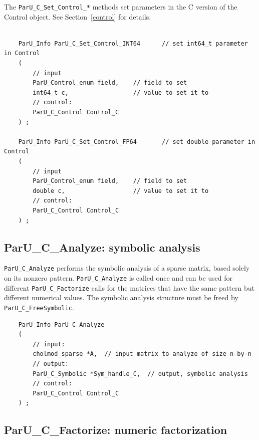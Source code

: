 \documentclass[12pt]{article}
\begin{document}
The \verb'ParU_C_Set_Control_*' methods set parameters in the C version of the
Control object.  See Section~\ref{control} for details.

    {\footnotesize
    \begin{verbatim}

    ParU_Info ParU_C_Set_Control_INT64      // set int64_t parameter in Control
    (
        // input
        ParU_Control_enum field,    // field to set
        int64_t c,                  // value to set it to
        // control:
        ParU_C_Control Control_C
    ) ;

    ParU_Info ParU_C_Set_Control_FP64       // set double parameter in Control
    (
        // input
        ParU_Control_enum field,    // field to set
        double c,                   // value to set it to
        // control:
        ParU_C_Control Control_C
    ) ; \end{verbatim} }

\subsection{{\sf ParU\_C\_Analyze}: symbolic analysis}

    \verb'ParU_C_Analyze' performs the symbolic analysis of a sparse
        matrix, based solely on its nonzero pattern.  \verb'ParU_C_Analyze' is
        called once and can be used for different \verb'ParU_C_Factorize' calls
        for the matrices that have the same pattern but different numerical
        values.  The symbolic analysis structure must be freed by
        \verb'ParU_C_FreeSymbolic'.

    {\footnotesize
    \begin{verbatim}
    ParU_Info ParU_C_Analyze
    (
        // input:
        cholmod_sparse *A,  // input matrix to analyze of size n-by-n
        // output:
        ParU_C_Symbolic *Sym_handle_C,  // output, symbolic analysis
        // control:
        ParU_C_Control Control_C
    ) ; \end{verbatim} }

\subsection{{\sf ParU\_C\_Factorize}: numeric factorization}
\end{document}
